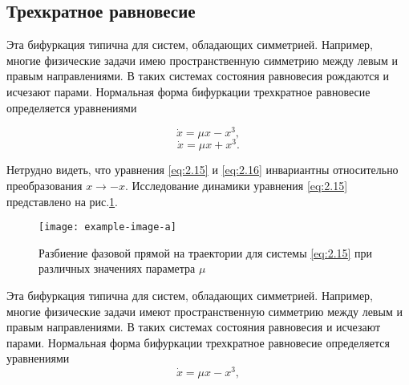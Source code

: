 \subsection{Трехкратное равновесие} %

Эта бифуркация типична для систем, обладающих симметрией.
Например, многие физические задачи имею пространственную симметрию
между левым и правым направлениями. В таких системах состояния
равновесия рождаются и исчезают парами. Нормальная форма бифуркации
трехкратное равновесие определяется уравнениями

\begin{equation}
	\label{eq:2.15}
	\dot x = \mu x - x^3,
\end{equation}
\begin{equation}
	\label{eq:2.16}
	\dot x = \mu x + x^3. 
\end{equation}

Нетрудно видеть, что уравнения \eqref{eq:2.15} и \eqref{eq:2.16} инвариантны относительно
преобразования $x \rightarrow -x$. Исследование динамики уравнения \eqref{eq:2.15} представлено
на рис.\ref{fig:2.9}.

\begin{figure}[h!]
	\centering
	\texttt{[image: example-image-a]}
	\caption{Разбиение фазовой прямой на траектории для системы \eqref{eq:2.15} при различных значениях параметра $\mu$}
	\label{fig:2.9}
\end{figure}


Эта бифуркация типична для систем, обладающих симметрией. Например, многие физические задачи имеют пространственную симметрию между левым и правым направлениями. В таких системах состояния равновесия и исчезают парами. Нормальная форма бифуркации трехкратное равновесие определяется уравнениями
\begin{equation}
    \label{eq:2.15}
    \dot x = \mu x - x^3,
\end{equation}

